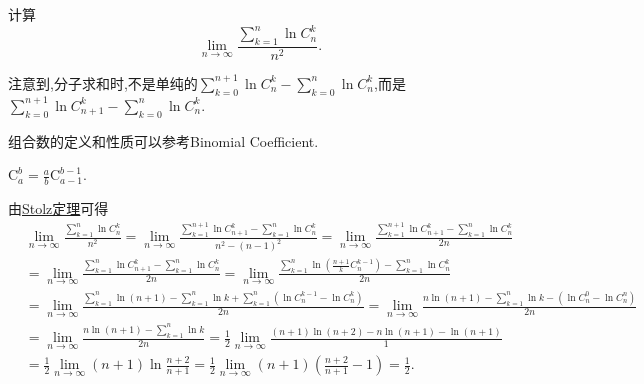 \documentclass[../../main.tex]{subfiles}%
\begin{document}
\begin{example}
计算
\[
\lim_{n \to \infty} \frac{\sum\limits_{k = 1}^{n} \ln C_{n}^{k}}{n^2}.
\]
\end{example}
\begin{note}
注意到,分子求和时,不是单纯的\(\sum\limits_{k = 0}^{n + 1} \ln C_{n}^{k} - \sum\limits_{k = 0}^{n} \ln C_{n}^{k}\),而是\(\sum\limits_{k = 0}^{n + 1} \ln C_{n + 1}^{k} - \sum\limits_{k = 0}^{n} \ln C_{n}^{k}\).

组合数的定义和性质可以参考Binomial Coefficient.
\end{note}
\begin{conclusion}
$\mathrm{C}_{a}^{b}=\frac{a}{b}\mathrm{C}_{a-1}^{b-1}$.
\end{conclusion}
\begin{solution}
由\hyperref[theorem:Stolz定理]{Stolz定理}可得\begin{align*}
&\lim_{n\rightarrow \infty} \frac{\sum\limits_{k=1}^n{\ln C_{n}^{k}}}{n^2}=\lim_{n\rightarrow \infty} \frac{\sum\limits_{k=1}^{n+1}{\ln C_{n+1}^{k}}-\sum\limits_{k=1}^n{\ln C_{n}^{k}}}{n^2-\left( n-1 \right) ^2}=\lim_{n\rightarrow \infty} \frac{\sum\limits_{k=1}^{n+1}{\ln C_{n+1}^{k}}-\sum\limits_{k=1}^n{\ln C_{n}^{k}}}{2n}
\\
&=\lim_{n\rightarrow \infty} \frac{\sum\limits_{k=1}^n{\ln C_{n+1}^{k}}-\sum\limits_{k=1}^n{\ln C_{n}^{k}}}{2n}=\lim_{n\rightarrow \infty} \frac{\sum\limits_{k=1}^{n\,\,}{\ln \left( \frac{n+1}{k}C_{n}^{k-1} \right)}-\sum\limits_{k=1}^n{\ln C_{n}^{k}}}{2n}
\\
&=\lim_{n\rightarrow \infty} \frac{\sum\limits_{k=1}^{n\,\,}{\ln \left( n+1 \right)}-\sum\limits_{k=1}^{n\,\,}{\ln k}+\sum\limits_{k=1}^n{\left( \ln C_{n}^{k-1}-\ln C_{n}^{k} \right)}}{2n}=\lim_{n\rightarrow \infty} \frac{n\ln \left( n+1 \right) -\sum\limits_{k=1}^{n\,\,}{\ln k}-\left( \ln C_{n}^{0}-\ln C_{n}^{n} \right)}{2n}
\\
&=\lim_{n\rightarrow \infty} \frac{n\ln \left( n+1 \right) -\sum\limits_{k=1}^{n\,\,}{\ln k}}{2n}=\frac{1}{2}\lim_{n\rightarrow \infty} \frac{\left( n+1 \right) \ln \left( n+2 \right) -n\ln \left( n+1 \right) -\ln \left( n+1 \right)}{1}
\\
&=\frac{1}{2}\lim_{n\rightarrow \infty} \left( n+1 \right) \ln \frac{n+2}{n+1}=\frac{1}{2}\lim_{n\rightarrow \infty} \left( n+1 \right) \left( \frac{n+2}{n+1}-1 \right) =\frac{1}{2}.
\end{align*}

\end{solution}
\end{document}
